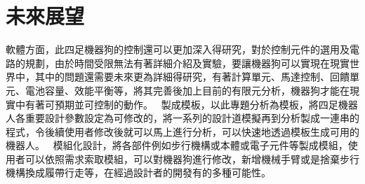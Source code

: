 \chapter{未來展望}
\hspace{-1.7em} 軟體方面，此四足機器狗的控制還可以更加深入得研究，對於控制元件的選用及電路的規劃，由於時間受限無法有著詳細介紹及實驗，要讓機器狗可以實現在現實世界中，其中的問題還需要未來更為詳細得研究，有著計算單元、馬達控制、回饋單元、電池容量、效能平衡等，將其完善後加上目前的有限元分析，機器狗才能在現實中有著可預期並可控制的動作。\
\hspace{-1.4em} 製成模板，以此專題分析為模板，將四足機器人各重要設計參數設定為可修改的，將一系列的設計道模擬再到分析製成一連串的程式，令後續使用者修改後就可以馬上進行分析，可以快速地透過模板生成可用的機器人。\
\hspace{-1.4em} 模組化設計，將各部件例如步行機構或本體或電子元件等製成模組，使用者可以依照需求索取模組，可以對機器狗進行修改，新增機械手臂或是捨棄步行機構換成履帶行走等，在經過設計者的開發有的多種可能性。
\newpage
